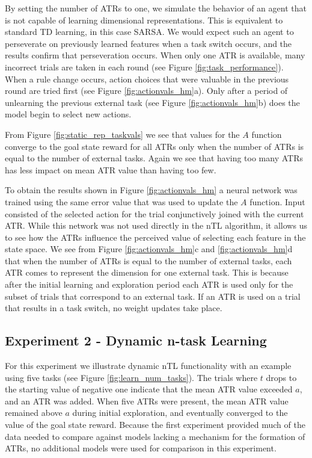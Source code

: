 \documentclass[10pt,letterpaper]{article}
\begin{document}
By setting the number of ATRs to one, we simulate the behavior of an agent that is not capable of learning dimensional representations. This is equivalent to standard TD learning, in this case SARSA. We would expect such an agent to perseverate on previously learned features when a task switch occurs, and the results confirm that perseveration occurs. When only one ATR is available, many incorrect trials are taken in each round (see Figure \ref{fig:task_performance}). When a rule change occurs, action choices that were valuable in the previous round are tried first (see Figure \ref{fig:actionvals_hm}a). Only after a period of unlearning the previous external task (see Figure \ref{fig:actionvals_hm}b) does the model begin to select new actions. 

From Figure \ref{fig:static_rep_taskvals} we see that values for the $ A $ function converge to the goal state reward for all ATRs only when the number of ATRs is equal to the number of external tasks. Again we see that having too many ATRs has less impact on mean ATR value than having too few.

To obtain the results shown in Figure \ref{fig:actionvals_hm} a neural network was trained using the same error value that was used to update the $ A $ function. Input consisted of the selected action for the trial conjunctively joined with the current ATR. While this network was not used directly in the nTL algorithm, it allows us to see how the ATRs influence the perceived value of selecting each feature in the state space. We see from Figure \ref{fig:actionvals_hm}c and \ref{fig:actionvals_hm}d that when the number of ATRs is equal to the number of external tasks, each ATR comes to represent the dimension for one external task. This is because after the initial learning and exploration period each ATR is used only for the subset of trials that correspond to an external task. If an ATR is used on a trial that results in a task switch, no weight updates take place.

\subsection{Experiment 2 - Dynamic n-task Learning}

For this experiment we illustrate dynamic nTL functionality with an example using five tasks (see Figure \ref{fig:learn_num_tasks}). The trials where $t$ drops to the starting value of negative one indicate that the mean ATR value exceeded $a$, and an ATR was added. When five ATRs were present, the mean ATR value remained above $a$ during initial exploration, and eventually converged to the value of the goal state reward. Because the first experiment provided much of the data needed to compare against models lacking a mechanism for the formation of ATRs, no additional models were used for comparison in this experiment.
\end{document}
